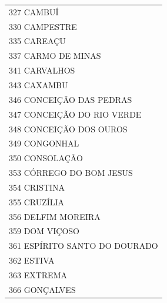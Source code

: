 \documentclass{article}
\begin{document}
\begin{longtable}[c]{m{18cm}}
\multicolumn{1}{l}{ \hspace{2em} 327 CAMBUÍ } \\
\multicolumn{1}{l}{ \hspace{2em} 330 CAMPESTRE } \\
\multicolumn{1}{l}{ \hspace{2em} 335 CAREAÇU } \\
\multicolumn{1}{l}{ \hspace{2em} 337 CARMO DE MINAS } \\
\multicolumn{1}{l}{ \hspace{2em} 341 CARVALHOS } \\
\multicolumn{1}{l}{ \hspace{2em} 343 CAXAMBU } \\
\multicolumn{1}{l}{ \hspace{2em} 346 CONCEIÇÃO DAS PEDRAS } \\
\multicolumn{1}{l}{ \hspace{2em} 347 CONCEIÇÃO DO RIO VERDE } \\
\multicolumn{1}{l}{ \hspace{2em} 348 CONCEIÇÃO DOS OUROS } \\
\multicolumn{1}{l}{ \hspace{2em} 349 CONGONHAL } \\
\multicolumn{1}{l}{ \hspace{2em} 350 CONSOLAÇÃO } \\
\multicolumn{1}{l}{ \hspace{2em} 353 CÓRREGO DO BOM JESUS } \\
\multicolumn{1}{l}{ \hspace{2em} 354 CRISTINA } \\
\multicolumn{1}{l}{ \hspace{2em} 355 CRUZÍLIA } \\
\multicolumn{1}{l}{ \hspace{2em} 356 DELFIM MOREIRA } \\
\multicolumn{1}{l}{ \hspace{2em} 359 DOM VIÇOSO } \\
\multicolumn{1}{l}{ \hspace{2em} 361 ESPÍRITO SANTO DO DOURADO } \\
\multicolumn{1}{l}{ \hspace{2em} 362 ESTIVA } \\
\multicolumn{1}{l}{ \hspace{2em} 363 EXTREMA } \\
\multicolumn{1}{l}{ \hspace{2em} 366 GONÇALVES } \\

\end{longtable}
\end{document}
